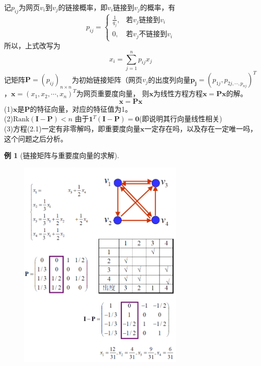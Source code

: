 \documentclass[12pt, a4paper, oneside]{ctexbook}
\newtheorem{example}[theorem]{例}
\begin{document}
\noindent 记$p_{ij}$为网页$v_i$到$v_j$的链接概率，即$v_i$链接到$v_j$的概率，有
$$p_{ij}=\begin{cases}
\frac{1}{q_j},&\text{若}v_j\text{链接到}v_i\\
0,&\text{若}v_j\text{不链接到}v_i
\end{cases}$$
所以，上式改写为
$$x_i=\sum_{j=1}^np_{ij}x_j$$
记矩阵$\mathbf{P}=(p_{ij})_{n\times n}$为初始链接矩阵（网页$v_j$的出度列向量$\mathbf{p_j} = (p_{1j},p_{2j,\cdots,p_{nj}})^T$，$\mathbf{x}=(x_1,x_2,\cdots,x_n)^T$为网页重要度向量，
则$\mathbf{x}$为线性方程方程$\mathbf{x}=\mathbf{P}\mathbf{x}$的解。
\begin{equation}
    \mathbf{x}=\mathbf{P}\mathbf{x}
\end{equation}
\noindent(1)$\mathbf{x}$是$\mathbf{P}$的特征向量，对应的特征值为1。\\
(2)$\text{Rank}(\mathbf{I}-\mathbf{P})<n$ 由于$\mathbf{1}^T(\mathbf{I}-\mathbf{P}) = \mathbf{0}$(即说明其行向量线性相关)\\
(3)方程(2.1)一定有非零解吗，即重要度向量$\mathbf{x}$一定存在吗，以及存在一定唯一吗，这个问题之后分析。
\begin{example}[链接矩阵与重要度向量的求解]
    \begin{figure}[H]
        \centering
        \includegraphics[width=8cm]{assets/网页重要度例题.png}
    \end{figure}
\end{example}
\end{document}
